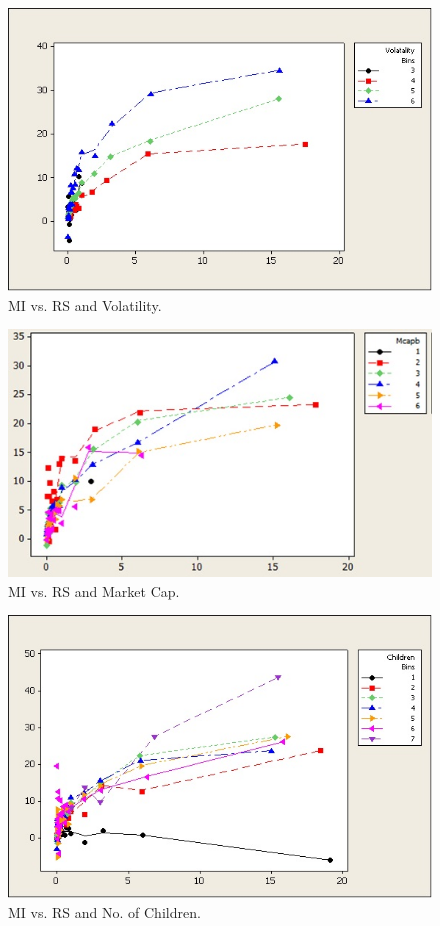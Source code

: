 	\begin{figure}
	\centering
	\includegraphics[width=\textwidth]{chapters/chapter_exec_models/figures/fig5.jpg}
	\caption{MI vs. RS and Volatility. \label{fig:threeoffive}}
	\end{figure}

	\begin{figure}
	\centering
	\includegraphics[width=\textwidth]{chapters/chapter_exec_models/figures/fig6.jpg}
	\caption{MI vs. RS and Market Cap. \label{fig:fouroffive}}
	\end{figure}

	\begin{figure}
	\centering
	\includegraphics[width=\textwidth]{chapters/chapter_exec_models/figures/fig7.jpg}
	\caption{MI vs. RS and No. of Children. \label{fig:fiveoffive}}
	\end{figure}


